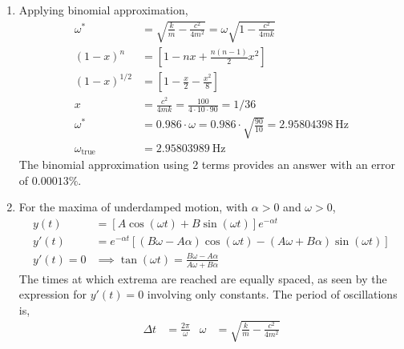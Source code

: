 \begin{enumerate}
    \item Applying binomial approximation,
          \begin{align}
              \omega^{*}           & = \sqrt{\frac{k}{m} - \frac{c^{2}}{4m^{2}}}
              = \omega\sqrt{1 - \frac{c^{2}}{4mk}}                               \\
              (1 - x)^{n}          & =  \left[ 1 - nx + \frac{n(n-1)}{2}x^{2}
              \right]                                                            \\
              (1 - x)^{1/2}        & =  \left[ 1 - \frac{x}{2} - \frac{x^{2}}{8}
              \right]                                                            \\
              x                    & = \frac{c^{2}}{4mk} = \frac{100}
              {4 \cdot 10 \cdot 90} = 1/36                                       \\
              \omega^{*}           & = 0.986 \cdot \omega = 0.986 \cdot
              \sqrt{\frac{90}{10}} = \SI{2.95804398}{\Hz}                        \\
              \omega_{\text{true}} & = \SI{2.95803989}{\Hz}
          \end{align}
          The binomial approximation using 2 terms provides an answer
          with an error of $ 0.00013\% $.

    \item For the maxima of underdamped motion, with $ \alpha > 0 $ and $ \omega > 0 $,
          \begin{align}
              y(t)      & = [A \cos(\omega t) + B\sin(\omega t)]e^{-\alpha t} \\
              y'(t)     & = e^{-\alpha t}[(B\omega - A\alpha)\cos(\omega t)
              - (A\omega + B\alpha)\sin(\omega t)]                            \\
              y'(t) = 0 & \implies \tan(\omega t) = \frac{B\omega - A\alpha}{
                  A\omega + B\alpha}
          \end{align}
          The times at which extrema are reached are equally spaced, as seen by the
          expression for $ y'(t) = 0 $ involving only constants.
          The period of oscillations is,
          \begin{align}
              \Delta t & = \frac{2\pi}{\omega } & \omega & = \sqrt{\frac{k}{m}
                  - \frac{c^{2}}{4m^{2}}}
          \end{align}


\end{enumerate}

